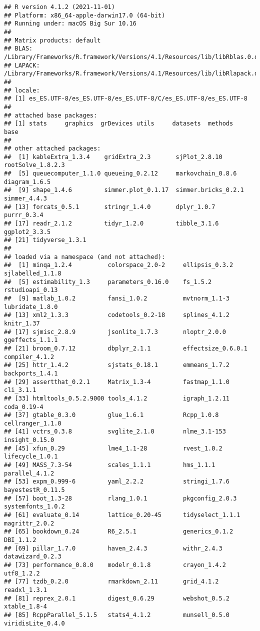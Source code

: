 \documentclass[
]{book}
\theoremstyle{definition}
\theoremstyle{definition}
\theoremstyle{definition}
\theoremstyle{definition}
\theoremstyle{remark}
\begin{document}
\begin{verbatim}
## R version 4.1.2 (2021-11-01)
## Platform: x86_64-apple-darwin17.0 (64-bit)
## Running under: macOS Big Sur 10.16
## 
## Matrix products: default
## BLAS:   /Library/Frameworks/R.framework/Versions/4.1/Resources/lib/libRblas.0.dylib
## LAPACK: /Library/Frameworks/R.framework/Versions/4.1/Resources/lib/libRlapack.dylib
## 
## locale:
## [1] es_ES.UTF-8/es_ES.UTF-8/es_ES.UTF-8/C/es_ES.UTF-8/es_ES.UTF-8
## 
## attached base packages:
## [1] stats     graphics  grDevices utils     datasets  methods   base     
## 
## other attached packages:
##  [1] kableExtra_1.3.4    gridExtra_2.3       sjPlot_2.8.10       rootSolve_1.8.2.3  
##  [5] queuecomputer_1.1.0 queueing_0.2.12     markovchain_0.8.6   diagram_1.6.5      
##  [9] shape_1.4.6         simmer.plot_0.1.17  simmer.bricks_0.2.1 simmer_4.4.3       
## [13] forcats_0.5.1       stringr_1.4.0       dplyr_1.0.7         purrr_0.3.4        
## [17] readr_2.1.2         tidyr_1.2.0         tibble_3.1.6        ggplot2_3.3.5      
## [21] tidyverse_1.3.1    
## 
## loaded via a namespace (and not attached):
##  [1] minqa_1.2.4          colorspace_2.0-2     ellipsis_0.3.2       sjlabelled_1.1.8    
##  [5] estimability_1.3     parameters_0.16.0    fs_1.5.2             rstudioapi_0.13     
##  [9] matlab_1.0.2         fansi_1.0.2          mvtnorm_1.1-3        lubridate_1.8.0     
## [13] xml2_1.3.3           codetools_0.2-18     splines_4.1.2        knitr_1.37          
## [17] sjmisc_2.8.9         jsonlite_1.7.3       nloptr_2.0.0         ggeffects_1.1.1     
## [21] broom_0.7.12         dbplyr_2.1.1         effectsize_0.6.0.1   compiler_4.1.2      
## [25] httr_1.4.2           sjstats_0.18.1       emmeans_1.7.2        backports_1.4.1     
## [29] assertthat_0.2.1     Matrix_1.3-4         fastmap_1.1.0        cli_3.1.1           
## [33] htmltools_0.5.2.9000 tools_4.1.2          igraph_1.2.11        coda_0.19-4         
## [37] gtable_0.3.0         glue_1.6.1           Rcpp_1.0.8           cellranger_1.1.0    
## [41] vctrs_0.3.8          svglite_2.1.0        nlme_3.1-153         insight_0.15.0      
## [45] xfun_0.29            lme4_1.1-28          rvest_1.0.2          lifecycle_1.0.1     
## [49] MASS_7.3-54          scales_1.1.1         hms_1.1.1            parallel_4.1.2      
## [53] expm_0.999-6         yaml_2.2.2           stringi_1.7.6        bayestestR_0.11.5   
## [57] boot_1.3-28          rlang_1.0.1          pkgconfig_2.0.3      systemfonts_1.0.2   
## [61] evaluate_0.14        lattice_0.20-45      tidyselect_1.1.1     magrittr_2.0.2      
## [65] bookdown_0.24        R6_2.5.1             generics_0.1.2       DBI_1.1.2           
## [69] pillar_1.7.0         haven_2.4.3          withr_2.4.3          datawizard_0.2.3    
## [73] performance_0.8.0    modelr_0.1.8         crayon_1.4.2         utf8_1.2.2          
## [77] tzdb_0.2.0           rmarkdown_2.11       grid_4.1.2           readxl_1.3.1        
## [81] reprex_2.0.1         digest_0.6.29        webshot_0.5.2        xtable_1.8-4        
## [85] RcppParallel_5.1.5   stats4_4.1.2         munsell_0.5.0        viridisLite_0.4.0
\end{verbatim}
\end{document}
